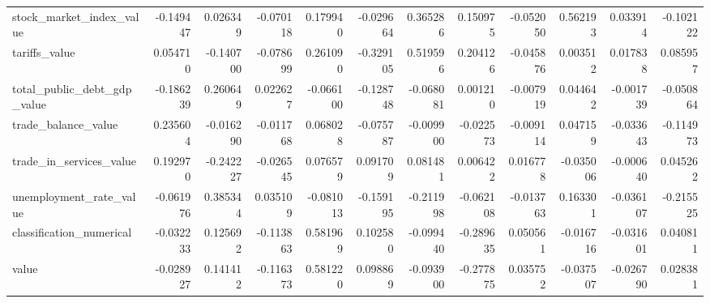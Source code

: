 \begin{tabular}{lrrrrrrrrrrr}
stock_market_index_value & -0.149447 & 0.026349 & -0.070118 & 0.179940 & -0.029664 & 0.365286 & 0.150975 & -0.052050 & 0.562193 & 0.033914 & -0.102122 \\
tariffs_value & 0.054710 & -0.140700 & -0.078699 & 0.261090 & -0.329105 & 0.519596 & 0.204126 & -0.045876 & 0.003512 & 0.017838 & 0.085957 \\
total_public_debt_gdp_value & -0.186239 & 0.260649 & 0.022627 & -0.066100 & -0.128748 & -0.068081 & 0.001210 & -0.007919 & 0.044642 & -0.001739 & -0.050864 \\
trade_balance_value & 0.235604 & -0.016290 & -0.011768 & 0.068028 & -0.075787 & -0.009900 & -0.022573 & -0.009114 & 0.047159 & -0.033643 & -0.114973 \\
trade_in_services_value & 0.192970 & -0.242227 & -0.026545 & 0.076579 & 0.091709 & 0.081481 & 0.006422 & 0.016778 & -0.035006 & -0.000640 & 0.045262 \\
unemployment_rate_value & -0.061976 & 0.385344 & 0.035109 & -0.081013 & -0.159195 & -0.211998 & -0.062108 & -0.013763 & 0.163301 & -0.036107 & -0.215525 \\
classification_numerical & -0.032233 & 0.125692 & -0.113863 & 0.581969 & 0.102580 & -0.099440 & -0.289635 & 0.050561 & -0.016716 & -0.031601 & 0.040811 \\
value & -0.028927 & 0.141412 & -0.116373 & 0.581220 & 0.098869 & -0.093900 & -0.277875 & 0.035752 & -0.037507 & -0.026790 & 0.028381 \\
\bottomrule
\end{tabular}
